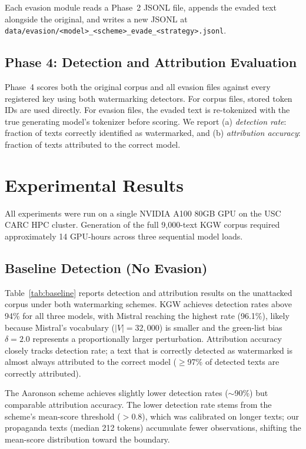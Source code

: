 \documentclass[11pt]{article}
\begin{document}
Each evasion module reads a Phase~2 JSONL file, appends the evaded text
alongside the original, and writes a new JSONL at
\texttt{data/evasion/<model>\_<scheme>\_evade\_<strategy>.jsonl}.

\subsection{Phase 4: Detection and Attribution Evaluation}
\label{sec:phase4}

Phase~4 scores both the original corpus and all evasion files against every
registered key using both watermarking detectors.
For corpus files, stored token IDs are used directly.
For evasion files, the evaded text is re-tokenized with the true generating
model's tokenizer before scoring.
We report (a) \emph{detection rate}: fraction of texts correctly identified
as watermarked, and (b) \emph{attribution accuracy}: fraction of texts
attributed to the correct model.

\section{Experimental Results}
\label{sec:results}

All experiments were run on a single NVIDIA A100 80GB GPU on the USC CARC HPC
cluster.
Generation of the full 9{,}000-text KGW corpus required approximately 14 GPU-hours
across three sequential model loads.

\subsection{Baseline Detection (No Evasion)}

Table~\ref{tab:baseline} reports detection and attribution results on the
unattacked corpus under both watermarking schemes.
KGW achieves detection rates above 94\% for all three models, with Mistral
reaching the highest rate (96.1\%), likely because Mistral's vocabulary
($|V|{=}32{,}000$) is smaller and the green-list bias $\delta{=}2.0$
represents a proportionally larger perturbation.
Attribution accuracy closely tracks detection rate; a text that is correctly
detected as watermarked is almost always attributed to the correct model
($\geq$97\% of detected texts are correctly attributed).

The Aaronson scheme achieves slightly lower detection rates ($\sim$90\%) but
comparable attribution accuracy.
The lower detection rate stems from the scheme's mean-score threshold ($>$0.8),
which was calibrated on longer texts; our propaganda texts (median 212 tokens)
accumulate fewer observations, shifting the mean-score distribution toward
the boundary.
\end{document}
